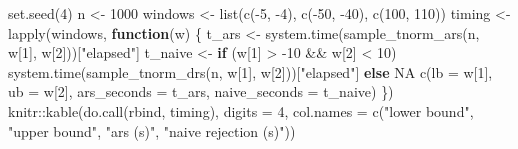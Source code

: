 \documentclass[
  letterpaper,
  DIV=11,
  numbers=noendperiod]{scrreprt}
\newenvironment{Shaded}{\begin{snugshade}}{\end{snugshade}}
\newcommand{\AttributeTok}[1]{\textcolor[rgb]{0.40,0.45,0.13}{#1}}
\newcommand{\ConstantTok}[1]{\textcolor[rgb]{0.56,0.35,0.01}{#1}}
\newcommand{\ControlFlowTok}[1]{\textcolor[rgb]{0.00,0.23,0.31}{\textbf{#1}}}
\newcommand{\DecValTok}[1]{\textcolor[rgb]{0.68,0.00,0.00}{#1}}
\newcommand{\FunctionTok}[1]{\textcolor[rgb]{0.28,0.35,0.67}{#1}}
\newcommand{\NormalTok}[1]{\textcolor[rgb]{0.00,0.23,0.31}{#1}}
\newcommand{\OtherTok}[1]{\textcolor[rgb]{0.00,0.23,0.31}{#1}}
\newcommand{\SpecialCharTok}[1]{\textcolor[rgb]{0.37,0.37,0.37}{#1}}
\newcommand{\StringTok}[1]{\textcolor[rgb]{0.13,0.47,0.30}{#1}}
\begin{document}
\begin{Shaded}
\begin{Highlighting}[]
\FunctionTok{set.seed}\NormalTok{(}\DecValTok{4}\NormalTok{)}
\NormalTok{n }\OtherTok{\textless{}{-}} \DecValTok{1000}
\NormalTok{windows }\OtherTok{\textless{}{-}} \FunctionTok{list}\NormalTok{(}\FunctionTok{c}\NormalTok{(}\SpecialCharTok{{-}}\DecValTok{5}\NormalTok{, }\SpecialCharTok{{-}}\DecValTok{4}\NormalTok{), }\FunctionTok{c}\NormalTok{(}\SpecialCharTok{{-}}\DecValTok{50}\NormalTok{, }\SpecialCharTok{{-}}\DecValTok{40}\NormalTok{), }\FunctionTok{c}\NormalTok{(}\DecValTok{100}\NormalTok{, }\DecValTok{110}\NormalTok{))}
\NormalTok{timing }\OtherTok{\textless{}{-}} \FunctionTok{lapply}\NormalTok{(windows, }\ControlFlowTok{function}\NormalTok{(w) \{}
\NormalTok{    t\_ars }\OtherTok{\textless{}{-}} \FunctionTok{system.time}\NormalTok{(}\FunctionTok{sample\_tnorm\_ars}\NormalTok{(n, w[}\DecValTok{1}\NormalTok{], w[}\DecValTok{2}\NormalTok{]))[}\StringTok{"elapsed"}\NormalTok{]}
\NormalTok{    t\_naive }\OtherTok{\textless{}{-}} \ControlFlowTok{if}\NormalTok{ (w[}\DecValTok{1}\NormalTok{] }\SpecialCharTok{\textgreater{}} \SpecialCharTok{{-}}\DecValTok{10} \SpecialCharTok{\&\&}\NormalTok{ w[}\DecValTok{2}\NormalTok{] }\SpecialCharTok{\textless{}} \DecValTok{10}\NormalTok{) }\FunctionTok{system.time}\NormalTok{(}\FunctionTok{sample\_tnorm\_drs}\NormalTok{(n, w[}\DecValTok{1}\NormalTok{], w[}\DecValTok{2}\NormalTok{]))[}\StringTok{"elapsed"}\NormalTok{] }\ControlFlowTok{else} \ConstantTok{NA}
    \FunctionTok{c}\NormalTok{(}\AttributeTok{lb =}\NormalTok{ w[}\DecValTok{1}\NormalTok{], }\AttributeTok{ub =}\NormalTok{ w[}\DecValTok{2}\NormalTok{], }\AttributeTok{ars\_seconds =}\NormalTok{ t\_ars, }\AttributeTok{naive\_seconds =}\NormalTok{ t\_naive)}
\NormalTok{\})}
\NormalTok{knitr}\SpecialCharTok{::}\FunctionTok{kable}\NormalTok{(}\FunctionTok{do.call}\NormalTok{(rbind, timing), }\AttributeTok{digits =} \DecValTok{4}\NormalTok{,}
             \AttributeTok{col.names =} \FunctionTok{c}\NormalTok{(}\StringTok{"lower bound"}\NormalTok{, }\StringTok{"upper bound"}\NormalTok{, }\StringTok{"ars (s)"}\NormalTok{, }\StringTok{"naive rejection (s)"}\NormalTok{))}
\end{Highlighting}
\end{Shaded}
\end{document}
